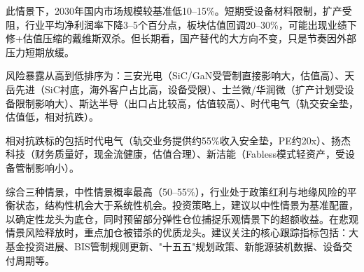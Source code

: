 此情景下，2030年国内市场规模较基准低10--15\%。短期受设备材料限制，扩产受阻，行业平均净利润率下降3--5个百分点，板块估值回调20--30\%，可能出现业绩下修+估值压缩的戴维斯双杀。但长期看，国产替代的大方向不变，只是节奏因外部压力短期放缓。

风险暴露从高到低排序为：三安光电（SiC/GaN受管制直接影响大，估值高）、天岳先进（SiC衬底，海外客户占比高，设备受限）、士兰微/华润微（扩产计划受设备限制影响大）、斯达半导（出口占比较高，估值较高）、时代电气（轨交安全垫，估值低，相对抗跌）。

相对抗跌标的包括时代电气（轨交业务提供约55\%收入安全垫，PE约20x）、扬杰科技（财务质量好，现金流健康，估值合理）、新洁能（Fabless模式轻资产，受设备管制影响小）。

\begin{keyinsight}[情景分析结论与投资启示]
综合三种情景，中性情景概率最高（50--55\%），行业处于政策红利与地缘风险的平衡状态，结构性机会大于系统性机会。投资策略上，建议以中性情景为基准配置，以确定性龙头为底仓，同时预留部分弹性仓位捕捉乐观情景下的超额收益。在悲观情景风险释放时，重点加仓被错杀的优质龙头。建议关注的核心跟踪指标包括：大基金投资进展、BIS管制规则更新、"十五五"规划政策、新能源装机数据、设备交付周期等。
\end{keyinsight}
